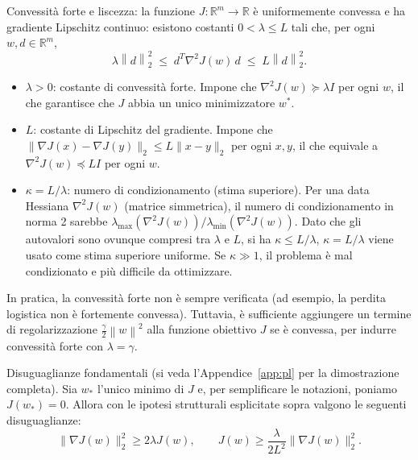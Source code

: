 \documentclass[a4paper,12pt]{article}
\numberwithin{equation}{section}
\numberwithin{figure}{section}
\numberwithin{table}{section}
\newcommand{\R}{\mathbb{R}}
\newcommand{\norm}[1]{\left\|#1\right\|}
\begin{document}
\begin{definitionbox}
  Convessit\`a forte e liscezza: la funzione $J: \R^m \to \R$ \`e uniformemente convessa e ha gradiente Lipschitz continuo: esistono costanti $0 < \lambda \leq L$ tali che, per ogni $w, d \in \R^m$,
  \[
    \lambda \norm{d}_2^2 \;\leq\; d^T \nabla^2 J(w)\, d \;\leq\; L \norm{d}_2^2.
  \]
  \begin{itemize}
    \item $\lambda > 0$: costante di convessità forte. Impone che $\nabla^2 J(w) \succeq \lambda I$ per ogni $w$, il che garantisce che $J$ abbia un unico minimizzatore $w^*$.
    \item $L$: costante di Lipschitz del gradiente. Impone che $\|\nabla J(x) - \nabla J(y)\|_2 \leq L\|x - y\|_2$ per ogni $x,y$, il che equivale a $\nabla^2 J(w) \preceq LI$ per ogni $w$.
    \item $\kappa = L/\lambda$: numero di condizionamento (stima superiore). Per una data Hessiana $\nabla^2 J(w)$ (matrice simmetrica), il numero di condizionamento in norma 2 sarebbe $\lambda_{\max}(\nabla^2 J(w))/\lambda_{\min}(\nabla^2 J(w))$. Dato che gli autovalori sono ovunque compresi tra $\lambda$ e $L$, si ha $\kappa \leq L/\lambda$, $\kappa = L/\lambda$ viene usato come stima superiore uniforme. Se $\kappa \gg 1$, il problema è mal condizionato e più difficile da ottimizzare.
\end{itemize}
  
\end{definitionbox}

\begin{notebox}
  In pratica, la convessit\`a forte non \`e sempre verificata (ad esempio, la perdita logistica non \`e fortemente convessa). Tuttavia, \`e sufficiente aggiungere un termine di regolarizzazione $\frac{\gamma}{2}\norm{w}^2$ alla funzione obiettivo $J$ se è convessa, per indurre convessit\`a forte con $\lambda = \gamma$.
\end{notebox}
\begin{notebox}
  Disuguaglianze fondamentali (si veda l'Appendice~\ref{app:pl} per la dimostrazione completa).
  Sia $w_*$ l'unico minimo di $J$ e, per semplificare le notazioni, poniamo $J(w_*) = 0$. Allora con le ipotesi strutturali esplicitate sopra valgono le seguenti disuguaglianze:
  \[
  \|\nabla J(w)\|_2^2 \geq 2\lambda J(w), \qquad J(w) \geq \frac{\lambda}{2L^2} \|\nabla J(w)\|_2^2.
  \]
\end{notebox}
\newpage

\end{document}
